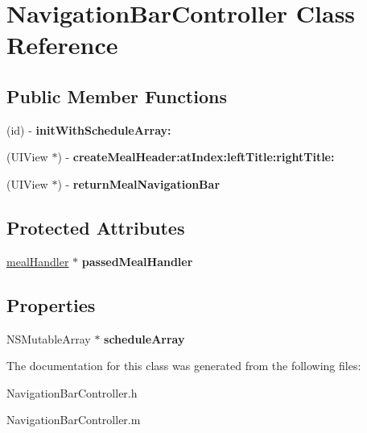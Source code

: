 \hypertarget{interface_navigation_bar_controller}{
\section{NavigationBarController Class Reference}
\label{interface_navigation_bar_controller}
}
\subsection*{Public Member Functions}
\begin{DoxyCompactItemize}
\item 
\hypertarget{interface_navigation_bar_controller_a414ccaffb24de442e0b3df08b04b57dc}{
(id) -\/ {\bfseries initWithScheduleArray:}}
\label{interface_navigation_bar_controller_a414ccaffb24de442e0b3df08b04b57dc}

\item 
\hypertarget{interface_navigation_bar_controller_a1ee773f0c7f99fa13e914cb06428d83c}{
(UIView $\ast$) -\/ {\bfseries createMealHeader:atIndex:leftTitle:rightTitle:}}
\label{interface_navigation_bar_controller_a1ee773f0c7f99fa13e914cb06428d83c}

\item 
\hypertarget{interface_navigation_bar_controller_a9ed8cfce43e6b8f41f36c03ce30653e9}{
(UIView $\ast$) -\/ {\bfseries returnMealNavigationBar}}
\label{interface_navigation_bar_controller_a9ed8cfce43e6b8f41f36c03ce30653e9}

\end{DoxyCompactItemize}
\subsection*{Protected Attributes}
\begin{DoxyCompactItemize}
\item 
\hypertarget{interface_navigation_bar_controller_adab719597cebe46cc5682e92bc942801}{
\hyperlink{interfacemeal_handler}{mealHandler} $\ast$ {\bfseries passedMealHandler}}
\label{interface_navigation_bar_controller_adab719597cebe46cc5682e92bc942801}

\end{DoxyCompactItemize}
\subsection*{Properties}
\begin{DoxyCompactItemize}
\item 
\hypertarget{interface_navigation_bar_controller_acbc419ade90454e6dea82581155d327b}{
NSMutableArray $\ast$ {\bfseries scheduleArray}}
\label{interface_navigation_bar_controller_acbc419ade90454e6dea82581155d327b}

\end{DoxyCompactItemize}


The documentation for this class was generated from the following files:\begin{DoxyCompactItemize}
\item 
NavigationBarController.h\item 
NavigationBarController.m\end{DoxyCompactItemize}
